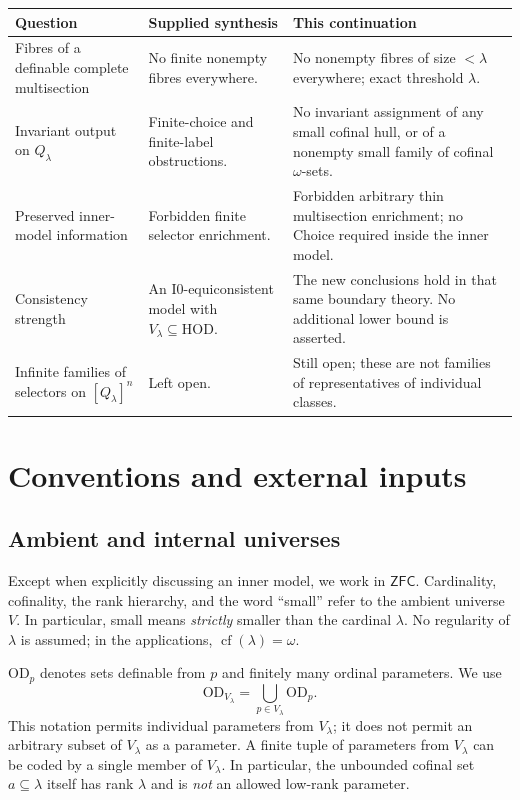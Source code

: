 \documentclass[11pt,letterpaper]{article}
\theoremstyle{definition}
\numberwithin{equation}{section}
\newcommand{\ZFC}{\mathsf{ZFC}}
\newcommand{\HOD}{\mathrm{HOD}}
\newcommand{\OD}{\mathrm{OD}}
\newcommand{\cf}{\operatorname{cf}}
\newcommand{\Izero}{\mathrm{I0}}
\begin{document}
\begin{center}
\small
\renewcommand{\arraystretch}{1.18}
\begin{tabularx}{\textwidth}{@{}P{.27\textwidth}YY@{}}
\toprule
\textbf{Question}&\textbf{Supplied synthesis}&\textbf{This continuation}\\\midrule
Fibres of a definable complete multisection&No finite nonempty fibres everywhere.&No nonempty fibres of size $<\lambda$ everywhere; exact threshold $\lambda$.\\
Invariant output on $Q_\lambda$&Finite-choice and finite-label obstructions.&No invariant assignment of any small cofinal hull, or of a nonempty small family of cofinal $\omega$-sets.\\
Preserved inner-model information&Forbidden finite selector enrichment.&Forbidden arbitrary thin multisection enrichment; no Choice required inside the inner model.\\
Consistency strength&An $\Izero$-equiconsistent model with $V_\lambda\subseteq\HOD$.&The new conclusions hold in that same boundary theory. No additional lower bound is asserted.\\
Infinite families of selectors on $[Q_\lambda]^n$&Left open.&Still open; these are not families of representatives of individual classes.\\
\bottomrule
\end{tabularx}
\end{center}

\section{Conventions and external inputs}\label{sec:conventions}

\subsection{Ambient and internal universes}

Except when explicitly discussing an inner model, we work in $\ZFC$. Cardinality, cofinality, the rank hierarchy, and the word ``small'' refer to the ambient universe $V$. In particular, small means \emph{strictly} smaller than the cardinal $\lambda$. No regularity of $\lambda$ is assumed; in the applications, $\cf(\lambda)=\omega$.

$\OD_p$ denotes sets definable from $p$ and finitely many ordinal parameters. We use
\[
 \OD_{V_\lambda}=\bigcup_{p\in V_\lambda}\OD_p.
\]
This notation permits individual parameters from $V_\lambda$; it does not permit an arbitrary subset of $V_\lambda$ as a parameter. A finite tuple of parameters from $V_\lambda$ can be coded by a single member of $V_\lambda$. In particular, the unbounded cofinal set $a\subseteq\lambda$ itself has rank $\lambda$ and is \emph{not} an allowed low-rank parameter.
\end{document}
